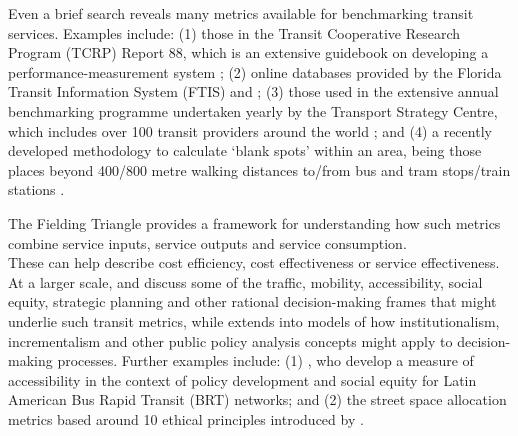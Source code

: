 \documentclass[preprint, 3p,
authoryear]{elsarticle} %
\begin{document}
Even a brief search reveals many metrics available for benchmarking
transit services. Examples include: (1) those in the Transit Cooperative
Research Program (TCRP) Report 88, which is an extensive guidebook on
developing a performance-measurement system \citep{Ryus:2003aa}; (2)
online databases provided by the Florida Transit Information System
(FTIS) \citep{Florida-Transit-Information-System:2018aa} and
\citet{UITP:2015aa}; (3) those used in the extensive annual benchmarking
programme undertaken yearly by the Transport Strategy Centre, which
includes over 100 transit providers around the world
\citep{Imperial-College-London:2023aa}; and (4) a recently developed
methodology to calculate `blank spots' within an area, being those
places beyond 400/800 metre walking distances to/from bus and tram
stops/train stations \citep{AlamriSultan2023GAoA}.

The Fielding Triangle \citep{FieldingGordonJ1987Mpts} provides a
framework for understanding how such metrics combine service inputs,
service outputs and service consumption.\\
These can help describe cost efficiency, cost effectiveness or service
effectiveness. At a larger scale, \citet{Litman:2003ab} and
\citet{Litman:2016aa} discuss some of the traffic, mobility,
accessibility, social equity, strategic planning and other rational
decision-making frames that might underlie such transit metrics, while
\citet{Reynolds:2017ah} extends into models of how institutionalism,
incrementalism and other public policy analysis concepts might apply to
decision-making processes. Further examples include: (1)
\citet{GuzmanLuisA.2017Aeit}, who develop a measure of accessibility in
the context of policy development and social equity for Latin American
Bus Rapid Transit (BRT) networks; and (2) the street space allocation
metrics based around 10 ethical principles introduced by
\citet{Creutzig2020streetspaceallocation}.
\end{document}

